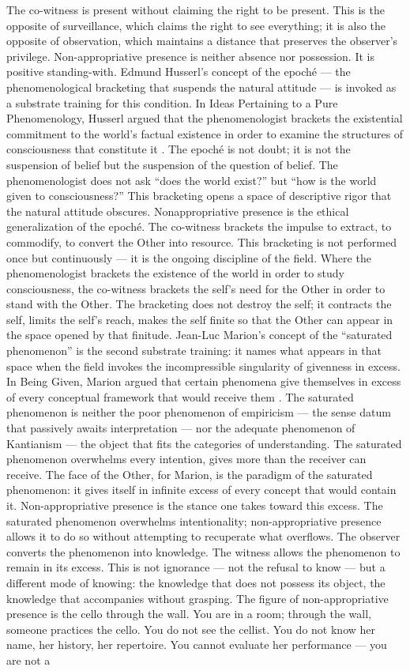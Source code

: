 The co-witness is present without claiming the right to be present. This is the opposite of surveillance, which claims the right to see everything; it is also the opposite of observation, which maintains a distance that preserves the observer’s privilege. Non-appropriative presence is neither absence nor possession. It is positive standing-with. Edmund Husserl’s concept of the epoché — the phenomenological bracketing that suspends the natural attitude — is invoked as a substrate training for this condition. In Ideas Pertaining to a Pure Phenomenology, Husserl argued that the phenomenologist brackets the existential commitment to the world’s factual existence in order to examine the structures of consciousness that constitute it \cite[pp.~54--67]{husserl_1913}. The epoché is not doubt; it is not the suspension of belief but the suspension of the question of belief. The phenomenologist does not ask “does the world exist?” but “how is the world given to consciousness?” This bracketing opens a space of descriptive rigor that the natural attitude obscures. Nonappropriative presence is the ethical generalization of the epoché. The co-witness brackets the impulse to extract, to commodify, to convert the Other into resource. This bracketing is not performed once but continuously — it is the ongoing discipline of the field. Where the phenomenologist brackets the existence of the world in order to study consciousness, the co-witness brackets the self’s need for the Other in order to stand with the Other. The bracketing does not destroy the self; it contracts the self, limits the self’s reach, makes the self finite so that the Other can appear in the space opened by that finitude. Jean-Luc Marion’s concept of the “saturated phenomenon” is the second substrate training: it names what appears in that space when the field invokes the incompressible singularity of givenness in excess. In Being Given, Marion argued that certain phenomena give themselves in excess of every conceptual framework that would receive them \cite[pp.~194--221]{marion_1997}. The saturated phenomenon is neither the poor phenomenon of empiricism — the sense datum that passively awaits interpretation — nor the adequate phenomenon of Kantianism — the object that fits the categories of understanding. The saturated phenomenon overwhelms every intention, gives more than the receiver can receive. The face of the Other, for Marion, is the paradigm of the saturated phenomenon: it gives itself in infinite excess of every concept that would contain it. Non-appropriative presence is the stance one takes toward this excess. The saturated phenomenon overwhelms intentionality; non-appropriative presence allows it to do so without attempting to recuperate what overflows. The observer converts the phenomenon into knowledge. The witness allows the phenomenon to remain in its excess. This is not ignorance — not the refusal to know — but a different mode of knowing: the knowledge that does not possess its object, the knowledge that accompanies without grasping. The figure of non-appropriative presence is the cello through the wall. You are in a room; through the wall, someone practices the cello. You do not see the cellist. You do not know her name, her history, her repertoire. You cannot evaluate her performance — you are not a 